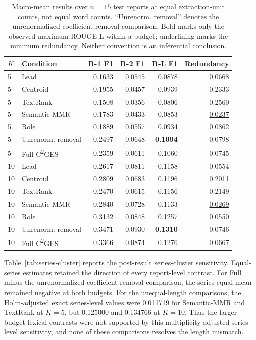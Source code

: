 \documentclass[applsci,article,submit,moreauthors]{Definitions/mdpi}
\newcommand{\cges}{C\textsuperscript{2}GES}
\begin{document}
\begin{table}[H]
\caption{Macro-mean results over $n=15$ test reports at equal extraction-unit counts, not equal word counts. ``Unrenorm. removal'' denotes the unrenormalized coefficient-removal comparison. Bold marks only the observed maximum ROUGE-L within a budget; underlining marks the minimum redundancy. Neither convention is an inferential conclusion.}
\label{tab:all-results}\centering\small
\begin{tabular}{llrrrr}
\toprule
$K$ & Condition & R-1 F1 & R-2 F1 & R-L F1 & Redundancy\\
\midrule
5 & Lead & 0.1633 & 0.0545 & 0.0878 & 0.0668\\
5 & Centroid & 0.1955 & 0.0457 & 0.0939 & 0.2333\\
5 & TextRank & 0.1508 & 0.0356 & 0.0806 & 0.2560\\
5 & Semantic-MMR & 0.1783 & 0.0433 & 0.0853 & \underline{0.0237}\\
5 & Role & 0.1889 & 0.0557 & 0.0934 & 0.0862\\
5 & Unrenorm. removal & 0.2497 & 0.0648 & \textbf{0.1094} & 0.0798\\
5 & Full \cges{} & 0.2359 & 0.0611 & 0.1060 & 0.0745\\
\midrule
10 & Lead & 0.2617 & 0.0811 & 0.1158 & 0.0554\\
10 & Centroid & 0.2809 & 0.0683 & 0.1196 & 0.2011\\
10 & TextRank & 0.2470 & 0.0615 & 0.1156 & 0.2149\\
10 & Semantic-MMR & 0.2840 & 0.0728 & 0.1133 & \underline{0.0269}\\
10 & Role & 0.3132 & 0.0848 & 0.1257 & 0.0550\\
10 & Unrenorm. removal & 0.3471 & 0.0930 & \textbf{0.1310} & 0.0746\\
10 & Full \cges{} & 0.3366 & 0.0874 & 0.1276 & 0.0667\\
\bottomrule
\end{tabular}
\end{table}

Table~\ref{tab:series-cluster} reports the post-result series-cluster sensitivity. Equal-series estimates retained the direction of every report-level contrast. For Full minus the unrenormalized coefficient-removal comparison, the series-equal mean remained negative at both budgets. For the unequal-length comparisons, the Holm-adjusted exact series-level values were 0.011719 for Semantic-MMR and TextRank at $K=5$, but 0.125000 and 0.134766 at $K=10$. Thus the larger-budget lexical contrasts were not supported by this multiplicity-adjusted series-level sensitivity, and none of these comparisons resolves the length mismatch.
\end{document}
